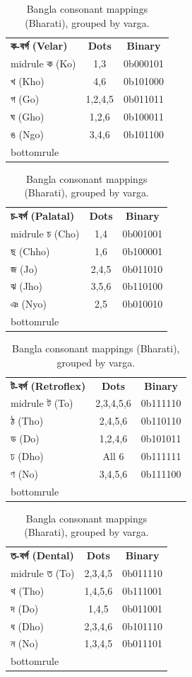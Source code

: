 \documentclass[11pt,a4paper,twoside]{article}
\begin{document}
\begin{table}[H]\centering
\caption{Bangla consonant mappings (Bharati), grouped by varga.}\label{tab:bangla-consonants}
\begin{minipage}{0.46\textwidth}
\begin{tabular}{l c c}\toprule
\textbf{ক-বর্গ (Velar)} & \textbf{Dots} & \textbf{Binary} \\midrule
ক (Ko) & 1,3   & 0b000101 \\
খ (Kho) & 4,6  & 0b101000 \\
গ (Go) & 1,2,4,5 & 0b011011 \\
ঘ (Gho) & 1,2,6 & 0b100011 \\
ঙ (Ngo) & 3,4,6 & 0b101100 \\bottomrule
\end{tabular}
\end{minipage}\hfill
\begin{minipage}{0.46\textwidth}
\begin{tabular}{l c c}\toprule
\textbf{চ-বর্গ (Palatal)} & \textbf{Dots} & \textbf{Binary} \\midrule
চ (Cho) & 1,4  & 0b001001 \\
ছ (Chho) & 1,6 & 0b100001 \\
জ (Jo) & 2,4,5 & 0b011010 \\
ঝ (Jho) & 3,5,6 & 0b110100 \\
ঞ (Nyo) & 2,5  & 0b010010 \\bottomrule
\end{tabular}
\end{minipage}

\vspace{0.6em}
\begin{minipage}{0.46\textwidth}
\begin{tabular}{l c c}\toprule
\textbf{ট-বর্গ (Retroflex)} & \textbf{Dots} & \textbf{Binary} \\midrule
ট (To) & 2,3,4,5,6 & 0b111110 \\
ঠ (Tho) & 2,4,5,6 & 0b110110 \\
ড (Do) & 1,2,4,6 & 0b101011 \\
ঢ (Dho) & All 6 & 0b111111 \\
ণ (No) & 3,4,5,6 & 0b111100 \\bottomrule
\end{tabular}
\end{minipage}\hfill
\begin{minipage}{0.46\textwidth}
\begin{tabular}{l c c}\toprule
\textbf{ত-বর্গ (Dental)} & \textbf{Dots} & \textbf{Binary} \\midrule
ত (To) & 2,3,4,5 & 0b011110 \\
থ (Tho) & 1,4,5,6 & 0b111001 \\
দ (Do) & 1,4,5 & 0b011001 \\
ধ (Dho) & 2,3,4,6 & 0b101110 \\
ন (No) & 1,3,4,5 & 0b011101 \\bottomrule
\end{tabular}
\end{minipage}


\end{table}
\end{document}
